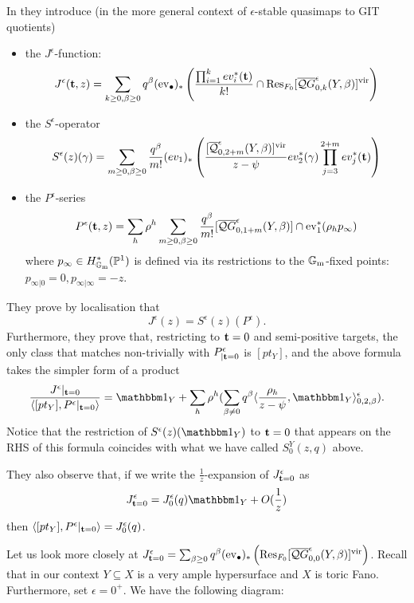 In \cite[Section 5]{CF-K-wallcrossing} they introduce (in the more general context of $\epsilon$-stable quasimaps to GIT quotients)
\begin{itemize}
 \item the $J^{\epsilon}$-function:
 \[
  J^\epsilon({\bf t}, z)=\sum_{k\geq 0,\beta\geq 0}q^\beta(\operatorname{ev}_\bullet)_*\left(\frac{\prod_{i=1}^k ev_i^*({\bf t})}{k!}\cap\operatorname{Res}_{F_0}[\overline{\mathcal QG}^{\epsilon}_{0,k}(Y,\beta)]^{\text{vir}}\right)
 \]
\item the $S^\epsilon$-operator
\[
 S^\epsilon(z)(\gamma)=\sum_{m\ge 0,\beta\ge 0}\frac{q^\beta}{m!} 
(ev_1)_*\left(\frac{[\overline{\mathcal Q}^{\epsilon}_{0,2+m}(Y,\beta)]^{\text{vir}}}{z-\psi}ev_2^*(\gamma)\prod_{j=3}^{2+m}ev_j^*({\bf t})\right)
\]
\item the $P^\epsilon$-series
\[
 P^\epsilon({\bf t}, z)=\sum_h\rho^h\sum_{m\geq 0,\beta\geq 0} \frac{q^\beta }{m!}
[\overline{\mathcal QG}^{\epsilon}_{0,1+m}(Y,\beta)]\cap \operatorname{ev}_1^*(\rho_h p_\infty)
\]
where $p_\infty\in H^*_{\mathbb{G}_{\text{m}}}(\mathbb P^1)$ is defined via its restrictions to the $\mathbb{G}_{\text{m}}$-fixed points: $p_{\infty|0}=0,p_{\infty|\infty}=-z$.
\end{itemize}
They prove by localisation that \cite[Theorem 5.4.1]{CF-K-wallcrossing}
\[
 J^\epsilon(z)=S^\epsilon(z)(P^\epsilon).
\]
Furthermore, they prove that, restricting to ${\bf t}=0$ and semi-positive targets, the only class that matches non-trivially with $P^\epsilon_{|{\bf t}=0}$ is $[pt_Y]$, and the above formula takes the simpler form of a product \cite[Corollary 5.5.1]{CF-K-wallcrossing}
\[
 \frac{J^\epsilon |_{{\bf t}=0}}{\langle [pt_Y],  P^\epsilon|_{{\bf t}=0}\rangle}=\mathbbm 1_Y+\sum_h\rho^h(\sum_{\beta\neq 0}q^\beta\langle\frac{\rho_h}{z-\psi},\mathbbm 1_Y\rangle_{0,2,\beta}^\epsilon).
\]
Notice that the restriction of $S^\epsilon(z)(\mathbbm 1_Y)$ to ${\bf t}=0$ that appears on the RHS of this formula coincides with what we have called $S^Y_0(z,q)$ above.

They also observe that, if we write the $\frac{1}{z}$-expansion of $J^{\epsilon}_{{\bf t}=0}$ as
\[
 J^{\epsilon}_{{\bf t}=0}=J^{\epsilon}_{0}(q)\mathbbm 1_Y+O(\frac{1}{z})
\]
then $\langle [pt_Y],  P^\epsilon|_{{\bf t}=0}\rangle=J^{\epsilon}_{0}(q)$.

Let us look more closely at $J^{\epsilon}_{{\bf t}=0}=\sum_{\beta\geq 0}q^\beta(\operatorname{ev}_\bullet)_*\left(\operatorname{Res}_{F_0}[\overline{\mathcal QG}^{\epsilon}_{0,0}(Y,\beta)]^{\text{vir}}\right)$. Recall that in our context $Y\subseteq X$ is a very ample hypersurface and $X$ is toric Fano. Furthermore, set $\epsilon=0^+$. We have the following diagram:

